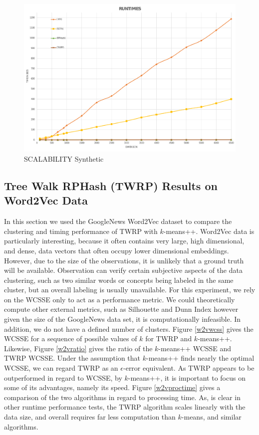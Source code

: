\begin{figure}
    \centering
    \includegraphics[width=.8\linewidth]{figs/Scalability_Synthetic} 
    \caption{SCALABILITY Synthetic}\label{twrp_scale}
\end{figure}

\subsection{Tree Walk RPHash (\textsf{TWRP}) Results on Word2Vec Data}

In this section we used the GoogleNews \cite{googlenews} Word2Vec dataset to compare the clustering
and timing performance of \textsf{TWRP} with $k$-means++.  Word2Vec data is particularly interesting, because
it often contains very large, high dimensional, and dense, data vectors that often occupy lower
dimensional embeddings.  However, due to the size of the observations, it is unlikely that a ground
truth will be available.  Observation can verify certain subjective aspects of the data clustering,
such as two similar words or concepts being labeled in the same cluster, but an overall labeling is
usually unavailable.  For this experiment, we rely on the WCSSE only to act as a performance metric.
We could theoretically compute other external metrics, such as Silhouette and Dunn Index however
given the size of the GoogleNews data set, it is computationally infeasible.  In addition, we do not
have a defined number of clusters.  Figure \ref{w2vwcss} gives the WCSSE for a sequence of possible
values of $k$ for \textsf{TWRP} and $k$-means++.  Likewise, Figure \ref{w2vratio} gives the ratio of the
$k$-means++ WCSSE and \textsf{TWRP} WCSSE.  Under the assumption that $k$-means++ finds nearly the optimal
WCSSE, we can regard \textsf{TWRP} as an $\epsilon$-error equivalent.  As \textsf{TWRP} appears to be outperformed in
regard to WCSSE, by $k$-means++, it is important to focus on some of its advantages, namely its
speed.  Figure \ref{w2vproctime} gives a comparison of the two algorithms in regard to processing
time.  As, is clear in other runtime performance tests, the TWRP algorithm scales linearly with the
data size, and overall requires far less computation than $k$-means, and similar algorithms.

